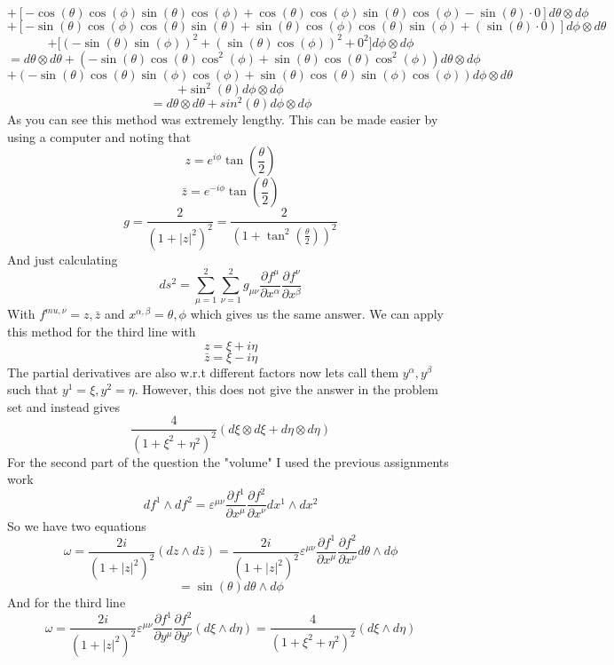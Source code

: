 \documentclass[12pt]{article}
\newcommand{\zbar}{\bar{z}}
\begin{document}
\begin{enumerate}
$$ + [ - \cos(\theta) \cos(\phi) \sin(\theta) \cos(\phi) + \cos(\theta) \cos(\phi) \sin(\theta) \cos(\phi) - \sin(\theta) \cdot 0 ] d \theta \otimes d \phi $$
$$ + [- \sin(\theta) \cos( \phi) \cos(\theta) \sin(\theta) + \sin(\theta) \cos(\phi) \cos(\theta) \sin(\phi) + (\sin(\theta) \cdot 0 ) ] d \phi \otimes d \theta $$
$$ + \big[ (- \sin(\theta) \sin(\phi) )^2 + (\sin(\theta) \cos(\phi))^2 + 0^2   \big] d \phi \otimes d \phi $$
$$ = d \theta \otimes d \theta + (- \sin(\theta) \cos(\theta) \cos^2 (\phi) + \sin(\theta) \cos(\theta) \cos^2 (\phi) ) d \theta \otimes d \phi $$
$$ + (- \sin(\theta) \cos(\theta) \sin(\phi) \cos(\phi) + \sin(\theta) \cos(\theta) \sin(\phi) \cos(\phi) ) d \phi \otimes d \theta $$
$$ + \sin^2 (\theta) d \phi \otimes d \phi $$
$$ = d \theta \otimes d \theta + sin^2 (\theta) d \phi \otimes d \phi $$
As you can see this method was extremely lengthy. This can be made easier by using a computer and noting that 
$$ z = e^{i \phi} \tan(\frac{\theta}{2}) $$
$$ \zbar = e^{-i \phi} \tan( \frac{\theta}{2}) $$
$$ g = \frac{2}{(1 + |z|^2)^2} = \frac{2}{(1+ \tan^2 (\frac{\theta}{2} ))^2} $$
And just calculating 
$$ ds^2 = \sum_{\mu = 1}^2 \sum_{\nu=1}^2 g_{\mu \nu} \frac{\partial f^{\mu}}{\partial x^{\alpha}} \frac{\partial f^{\nu}  }{\partial x^{\beta}} $$
With $f^{mu, \nu} = z, \zbar$ and  $x^{\alpha, \beta }= \theta, \phi$ which gives us the same answer. We can apply this method for the third line with 
$$ z = \xi + i \eta $$
$$ \zbar = \xi - i \eta $$ 
The partial derivatives are also w.r.t different factors now lets call them $y^{\alpha}, y^{\beta}$ such that $y^1 = \xi, y^2 = \eta$.  However, this does not give the answer in the problem set and instead gives 
$$ \frac{4}{(1 + \xi ^2 + \eta^2)^2} (d \xi \otimes d \xi + d \eta \otimes d \eta) $$
For the second part of the question the "volume" I used the previous assignments work 
$$ df^1 \wedge df^2 = \varepsilon^{\mu \nu} \frac{\partial f^1}{\partial x^{\mu}} \frac{\partial f^2}{\partial x^{\nu} } dx^1 \wedge d x^2 $$
So we have two equations 
$$ \omega = \frac{2 i }{(1 + |z|^2)^2} ( d z \wedge d \zbar) = \frac{2 i }{(1 + |z|^2)^2} \varepsilon^{\mu \nu} \frac{ \partial f^1}{\partial x^{\mu} } \frac{\partial f^2}{\partial x^{\nu} } d \theta \wedge d \phi $$ 
$$ = \sin (\theta) d \theta \wedge d \phi $$
And for the third line 
$$ \omega = \frac{2 i }{(1 + |z|^2)^2} \varepsilon^{\mu \nu} \frac{ \partial f^1}{\partial y^{\mu} } \frac{\partial f^2}{\partial y^{\nu} } ( d \xi \wedge d \eta )  = \frac{4}{(1 + \xi^2 + \eta^2)^2} ( d \xi \wedge d \eta ) $$




\end{enumerate}
\end{document}
